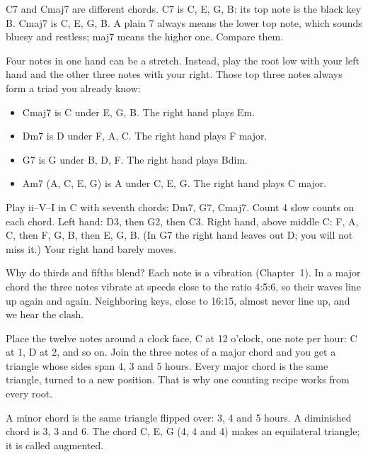 \begin{trapbox}
C7 and Cmaj7 are different chords. C7 is C, E, G, B\fl: its top note is the black key B\fl. Cmaj7 is C, E, G, B. A plain 7 always means the lower top note, which sounds bluesy and restless; maj7 means the higher one. Compare them. 
\end{trapbox}

Four notes in one hand can be a stretch. Instead, play the root low with your left hand and the other three notes with your right. Those top three notes always form a triad you already know:
\begin{itemize}
  \item Cmaj7 is C under E, G, B. The right hand plays Em. 
  \item Dm7 is D under F, A, C. The right hand plays F major. 
  \item G7 is G under B, D, F. The right hand plays Bdim. 
  \item Am7 (A, C, E, G) is A under C, E, G. The right hand plays C major. 
\end{itemize}

\begin{labbox}
Play ii--V--I in C with seventh chords: Dm7, G7, Cmaj7. Count 4 slow counts on each chord. Left hand: D3, then G2, then C3. Right hand, above middle C: F, A, C, then F, G, B, then E, G, B. (In G7 the right hand leaves out D; you will not miss it.) Your right hand barely moves. 
\end{labbox}

\begin{curiousbox}
Why do thirds and fifths blend? Each note is a vibration (Chapter~1). In a major chord the three notes vibrate at speeds close to the ratio 4:5:6, so their waves line up again and again. Neighboring keys, close to 16:15, almost never line up, and we hear the clash.

Place the twelve notes around a clock face, C at 12 o'clock, one note per hour: C\sh{} at 1, D at 2, and so on. Join the three notes of a major chord and you get a triangle whose sides span 4, 3 and 5 hours. Every major chord is the same triangle, turned to a new position. That is why one counting recipe works from every root.

A minor chord is the same triangle flipped over: 3, 4 and 5 hours. A diminished chord is 3, 3 and 6. The chord C, E, G\sh{} (4, 4 and 4) makes an equilateral triangle; it is called augmented.
\end{curiousbox}

